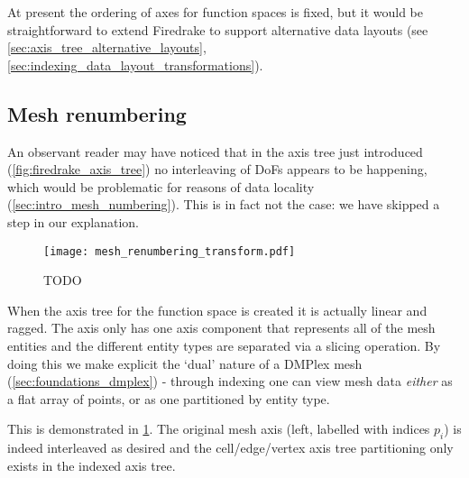 \documentclass[thesis]{subfiles}
\begin{document}
At present the ordering of axes for function spaces is fixed, but it would be straightforward to extend Firedrake to support alternative data layouts (see \cref{sec:axis_tree_alternative_layouts}, \cref{sec:indexing_data_layout_transformations}).

\subsection{Mesh renumbering}
\label{sec:firedrake_mesh_renumbering}

An observant reader may have noticed that in the axis tree just introduced (\cref{fig:firedrake_axis_tree}) no interleaving of DoFs appears to be happening, which would be problematic for reasons of data locality (\cref{sec:intro_mesh_numbering}).
This is in fact not the case: we have skipped a step in our explanation.

\begin{figure}
  \centering
  \texttt{[image: mesh\_renumbering\_transform.pdf]}
  \caption{TODO}
  \label{fig:mesh_renumbering_transform}
\end{figure}

When the axis tree for the function space is created it is actually linear and ragged.
The  axis only has one axis component that represents all of the mesh entities and the different entity types are separated via a slicing operation.
By doing this we make explicit the `dual' nature of a DMPlex mesh (\cref{sec:foundations_dmplex}) - through indexing one can view mesh data \emph{either} as a flat array of points, or as one partitioned by entity type.

This is demonstrated in \cref{fig:mesh_renumbering_transform}.
The original mesh axis (left, labelled with indices $p_i$) is indeed interleaved as desired and the cell/edge/vertex axis tree partitioning only exists in the indexed axis tree.
\end{document}
